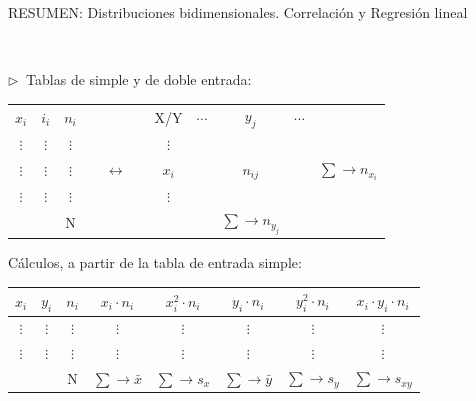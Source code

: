 \newpage

$\quad$

$\quad$

$\quad$ 

\begin{myblock}{RESUMEN: Distribuciones bidimensionales. Correlación y Regresión lineal}

$\quad$

$\triangleright \ $ Tablas de simple y de doble entrada:

\begin{table}[H]
\centering
\begin{tabular}{ccccccccc}
\multicolumn{1}{c|}{$x_i$} & \multicolumn{1}{c|}{$i_i$} & $n_i$ &  & \multicolumn{1}{c|}{X/Y} & $\cdots$ & $y_j$ & $\cdots$ &  \\ \cline{1-3} \cline{5-8}
\multicolumn{1}{c|}{$\vdots$} & \multicolumn{1}{c|}{$\vdots$} & $\vdots$ &  & \multicolumn{1}{c|}{$\vdots$} &  &  &  &  \\
\multicolumn{1}{c|}{$\vdots$} & \multicolumn{1}{c|}{$\vdots$} & $\vdots$ & $\quad \leftrightarrow \quad$ & \multicolumn{1}{c|}{$x_i$} &  & $n_{ij}$ & \multicolumn{1}{c|}{} & $\sum \to n_{x_i}$ \\
\multicolumn{1}{c|}{$\vdots$} & \multicolumn{1}{c|}{$\vdots$} & $\vdots$ &  & \multicolumn{1}{c|}{$\vdots$} &  &  &  &  \\ \cline{3-3} \cline{7-7}
 &  & N &  &  &  & $\sum \to n_{y_j}$ &  & 
\end{tabular}
\end{table}

Cálculos, a partir de la tabla de entrada simple:

\begin{table}[H]
\centering
\begin{tabular}{cccccccc}
$x_i$ & $y_i$ & $n_i$ & $x_i \cdot n_i$ & $x_i^2 \cdot n_i$ & $y_i \cdot n_i$ & $y_i^2 \cdot n_i$ & $x_i \cdot y_i \cdot n_i$ \\ \hline
\multicolumn{1}{c|}{$\vdots$} & \multicolumn{1}{c|}{$\vdots$} & \multicolumn{1}{c|}{$\vdots$} & \multicolumn{1}{c|}{$\vdots$} & \multicolumn{1}{c|}{$\vdots$} & \multicolumn{1}{c|}{$\vdots$} & \multicolumn{1}{c|}{$\vdots$} & $\vdots$ \\
\multicolumn{1}{c|}{$\vdots$} & \multicolumn{1}{c|}{$\vdots$} & \multicolumn{1}{c|}{$\vdots$} & \multicolumn{1}{c|}{$\vdots$} & \multicolumn{1}{c|}{$\vdots$} & \multicolumn{1}{c|}{$\vdots$} & \multicolumn{1}{c|}{$\vdots$} & $\vdots$ \\ \cline{3-8} 
 &  & \multicolumn{1}{c|}{N} & \multicolumn{1}{c|}{$\sum \to \bar x$} & \multicolumn{1}{c|}{$\sum \to s_x$} & \multicolumn{1}{c|}{$\sum \to \bar y$} & \multicolumn{1}{c|}{$\sum \to s_y$} & $\sum \to  s_{xy}$
\end{tabular}
\end{table}


\end{myblock}
